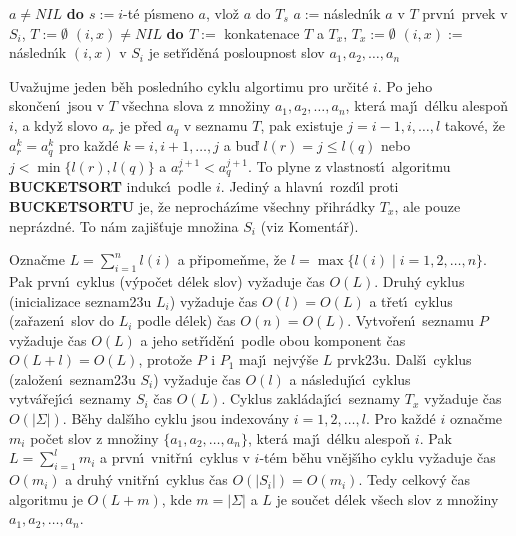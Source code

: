 \documentclass[a4paper,12pt]{article}
\begin{document}
\phantom{---}{\bf while} $a\ne NIL$ {\bf do\newline 
\phantom{{\rm------}}$s:=i$}-t\'e p\'\i smeno $a$, vlo\v z $a$ do $
T_s$\newline 
\phantom{------}$a:=$n\'asledn\'\i k $a$ v $T$\newline 
{}prvn\'\i\ prvek v $S_i$, $T:=\emptyset$\newline 
\phantom{---}{\bf while} $(i,x)\ne NIL$ {\bf do\newline 
\phantom{{\rm------}}$T:=$} konkatenace $T$ a $T_x$, $T_x:=\emptyset$\newline 
\phantom{------}$(i,x):=$n\'asledn\'\i k $(i,x)$ v $S_i$\newline 
{} je set\v r\'\i d\v en\'a posloupnost slov $a_1,a_2
,\dots,a_n$
\bigskip

\flushpar Uva\v zujme jeden b\v eh posledn\'\i ho cyklu algortimu 
pro ur\v cit\'e $i$. Po 
jeho skon\v cen\'\i\ jsou v $T$ v\v sechna slova z mno\v ziny 
$a_1,a_2,\dots,a_n$, kter\'a maj\'\i\ d\'elku alespo\v n $i$, a kdy\v z slovo 
$a_r$ je p\v red $a_q$ v seznamu $T$, pak existuje $j=i-1,i,\dots
,l$
takov\'e, \v ze $a^k_r=a^k_q$ pro ka\v zd\'e $k=i,i+1,\dots,j$ a bu\v d 
$l(r)=j\le l(q)$ nebo $j<\min\{l(r),l(q)\}$ a $a_r^{j+1}<a_q^{j+1}$. To plyne z 
vlastnost\'\i\ algoritmu {\bf BUCKETSORT} indukc\'\i\ podle $i$. Jedin\'y a 
hlavn\'\i\ rozd\'\i l proti {\bf BUCKETSORTU} je, \v ze neproch\'az\'\i me 
v\v sechny p\v rihr\'adky $T_x$, ale pouze nepr\'azdn\'e. 
To n\'am zaji\v s\v tuje mno\v zina $S_i$ (viz Koment\'a\v r). 
\medskip

\flushpar Ozna\v cme $L=\sum_{i=1}^nl(i)$ a p\v ripome\v nme, \v ze 
$l=\max\{l(i)\mid i=1,2,\dots,n\}$. Pak prvn\'\i\ cyklus (v\'ypo\v cet  
d\'elek slov) vy\-\v zaduje \v cas $O(L)$. Druh\'y cyklus (inicializace 
seznam\accent23u $L_i$) vy\v zaduje 
\v cas $O(l)=O(L)$ a t\v ret\'\i\ cyklus (za\v razen\'\i\ slov do $
L_i$ podle 
d\'elek) \v cas $O(n)=O(L)$. Vytvo\v ren\'\i\ 
seznamu $P_{}$ vy\v zaduje \v cas $O(L)$ a jeho set\v r\'\i d\v en\'\i\ podle obou 
komponent  
\v cas $O(L+l)=O(L)$, proto\v ze $P_{}$ i $P_1$ maj\'\i\ nejv\'y\v se $
L$ 
prvk\accent23u. Dal\v s\'\i\ cyklus (zalo\v zen\'\i\ seznam\accent23u 
$S_i$) vy\v zaduje \v cas $O(l)$ a n\'asleduj\'\i c\'\i\ cyklus vytv\'a\v rej\'\i c\'\i\ 
seznamy $S_i$ \v cas $O(L)$. Cyklus zakl\'adaj\'\i c\'\i\ 
seznamy $T_x$ vy\v zaduje \v cas $O(|\Sigma |)$. B\v ehy dal\v s\'\i ho cyklu jsou 
indexov\'any $i=1,2,\dots,l$. Pro ka\v zd\'e $i$ ozna\v cme $m_i$ po\v cet slov z 
mno\v ziny $\{a_1,a_2,\dots,a_n\}$, kter\'a maj\'\i\ d\'elku alespo\v n $
i$. Pak 
$L=\sum_{i=1}^lm_i$ a prvn\'\i\ vnit\v rn\'\i\ cyklus v $i$-t\'em b\v ehu vn\v ej\v s\'\i ho 
cyklu vy\v zaduje \v cas $O(m_i)$ a druh\'y vnit\v rn\'\i\ cyklus 
\v cas $O(|S_i|)=O(m_i)$. Tedy 
celkov\'y \v cas algoritmu je $O(L+m)$, kde $m=|\Sigma |$ a $L$ 
je sou\v cet d\'elek v\v sech slov z mno\v ziny $a_1,a_2,\dots,a_
n$.
\bigskip
\end{document}
